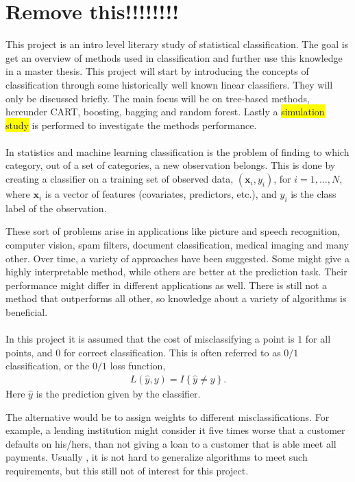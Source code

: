 \section{Remove this!!!!!!!!}
\label{sec:Remove this!!!!!!!!}

This project is an intro level literary study of statistical classification. The goal is get an overview of methods used in classification and further use this knowledge in a master thesis. This project will start by introducing the concepts of classification through some historically well known linear classifiers. They will only be discussed briefly. The main focus will be on tree-based methods, hereunder CART, boosting, bagging and random forest. Lastly a \colorbox{yellow}{simulation study} is performed to investigate the methods performance. 
\\
\\
In statistics and machine learning classification is the problem of finding to which category, out of a set of categories, a new observation belongs. This is done by creating a classifier on a training set of observed data, $(\mathbf{x}_i, y_i)$, for $i = 1, \ldots, N$, where $\mathbf{x}_i$ is a vector of features (covariates, predictors, etc.), and $y_i$ is the class label of the observation. 

These sort of problems arise in applications like picture and speech recognition, computer vision, spam filters, document classification, medical imaging and many other.
Over time, a variety of approaches have been suggested. Some might give a highly interpretable method, while others are better at the prediction task. Their performance might differ in different applications as well. There is still not a method that outperforms all other, so knowledge about a variety of algorithms is beneficial. 
\\
\\
In this project it is assumed that the cost of misclassifying a point is $1$ for all points, and $0$ for correct classification. This is often referred to as $0/1$ classification, or the $0/1$ loss function, 
\begin{align}
  L(\hat y, y) = I\left\{ \hat y \neq y \right\}.
\end{align}
Here $\hat y$ is the prediction given by the classifier. 

The alternative would be to assign weights to different misclassifications. For example, a lending institution might consider it five times worse that a customer defaults on his/hers, than not giving a loan to a customer that is able meet all payments. Usually , it is not hard to generalize algorithms to meet such requirements, but this still not of interest for this project.

